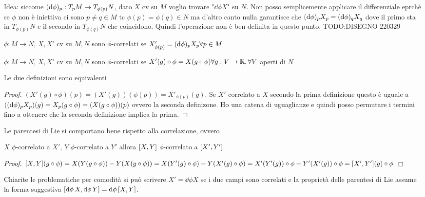 Idea: siccome $(\dd{\phi})_{p}: T_pM\to T_{\phi(p)}N$, dato $X$ cv su
$M$ voglio trovare "$\dd{\phi}X$" su $N$. Non posso semplicemente
applicare il differenziale eprchè se $\phi$ non è iniettiva ci sono
$p\neq q\in M$ tc $\phi(p)=\phi(q)\in N$ ma d'altro canto nulla
garantisce che $(\dd{\phi})_{p}X_p=(\dd{\phi})_{q}X_q$ dove il primo sta
in $T_{\phi(p)}N$ e il secondo in $T_{\phi(q)}N$ che coincidono.
Quindi l'operazione non è ben definita in questo punto.
TODO:DISEGNO 220329
\begin{definition}
    $\phi:M\to N$, $X,X'$ cv su $M,N$ sono $\phi$-correlati se
    $X'_{\phi(p)}=(\dd{\phi})_{p}X_p\forall p\in M$
\end{definition}
\begin{definition}
    $\phi:M\to N$, $X,X'$ cv su $M,N$ sono $\phi$-correlati se
    $X'(g)\circ\phi=X(g\circ\phi)\forall g:V\to\mathbb{R},\forall V$ aperti
    di $N$
\end{definition}
\begin{obs}
    Le due definizioni sono equivalenti
\end{obs}
\begin{proof}
    $(X'(g)\circ\phi)(p)=(X'(g))(\phi(p))=X'_{\phi(p)}(g)$. Se $X'$
    correlato a $X$ secondo la prima definizione questo è uguale a
    $((\dd{\phi})_{p}X_p)(g)=X_p(g\circ\phi)=(X(g\circ\phi))(p)$
    ovvero la seconda definizone. Ho una catena di uguaglianze e
    quindi posso permutare i termini fino a ottenere che la seconda
    definizione implica la prima.
\end{proof}
Le parentesi di Lie si comportano bene rispetto alla correlazione,
ovvero
\begin{theorem}
    $X$ $\phi$-correlato a $X'$,
    $Y$ $\phi$-correlato a $Y'$ allora
    $\comm{X}{Y}$ $\phi$-correlato a $\comm{X'}{Y'}$.
\end{theorem}
\begin{proof}
    $\comm{X}{Y}(g\circ\phi)=X(Y(g\circ\phi))-Y(X(g\circ\phi))=
    X(Y'(g)\circ\phi)-Y(X'(g)\circ\phi)=
    X'(Y'(g))\circ\phi-Y'(X'(g))\circ\phi=\comm{X'}{Y'}(g)\circ\phi$
\end{proof}

Chiarite le problematiche per comodità si può scrivere
$X'=\dd{\phi}X$ se i due campi sono correlati e la proprietà delle
parentesi di Lie assume la forma suggestiva
$\comm{\dd{\phi}X}{\dd{\phi}Y}=\dd{\phi}\comm{X}{Y}$.





